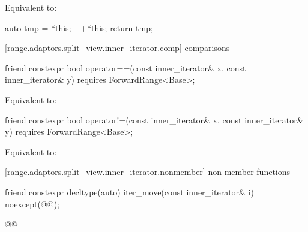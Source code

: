 \begin{itemdescr}
\pnum
\effects Equivalent to:
\begin{codeblock}
auto tmp = *this;
++*this;
return tmp;
\end{codeblock}
\end{itemdescr}

[range.adaptors.split_view.inner_iterator.comp]{ comparisons}

%
\begin{itemdecl}
friend constexpr bool operator==(const inner_iterator& x, const inner_iterator& y)
  requires ForwardRange<Base>;
\end{itemdecl}

\begin{itemdescr}
\pnum
\effects Equivalent to: 
\end{itemdescr}

%
\begin{itemdecl}
friend constexpr bool operator!=(const inner_iterator& x, const inner_iterator& y)
  requires ForwardRange<Base>;
\end{itemdecl}

\begin{itemdescr}
\pnum
\effects Equivalent to: 
\end{itemdescr}

[range.adaptors.split_view.inner_iterator.nonmember]{ non-member functions}

%
\begin{itemdecl}
friend constexpr decltype(auto) iter_move(const inner_iterator& i)
  noexcept(@\oldtxt{\seebelow}@);
\end{itemdecl}

\begin{itemdescr}
\pnum
\newtxt{\effects }

\oldtxt{\returns }

\pnum
{}
\begin{codeblock}
@@
\end{codeblock}
\end{itemdescr}

